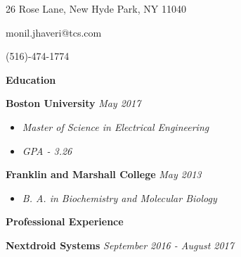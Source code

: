 \documentclass[8pt]{extarticle}
\begin{document}
\begin{center} 

26 Rose Lane, New Hyde Park, NY 11040

monil.jhaveri@tcs.com 

(516)-474-1774 
\end{center} 
\begin{changemargin}{-0.8cm}{0.0cm}
\textbf{Education}
\end{changemargin}
\vspace*{-0.4cm}
\makebox[\linewidth]{\rule{17cm}{0.4pt}}
\textbf{Boston University} \textit{May 2017}
\begin{itemize}
\item \textit{Master of Science in Electrical Engineering}
\item \textit{GPA - 3.26}
\end{itemize}
\textbf{Franklin and Marshall College} \textit{May 2013}
\begin{itemize}
\item \textit{B. A. in Biochemistry and Molecular Biology }

\end{itemize}

\begin{changemargin}{-0.8cm}{0.0cm}
\textbf{Professional Experience}
\end{changemargin}
\vspace*{-0.4cm}
\makebox[\linewidth]{\rule{17cm}{0.4pt}}
\textbf{Nextdroid Systems} \textit{September 2016 - August 2017}
\end{document}
